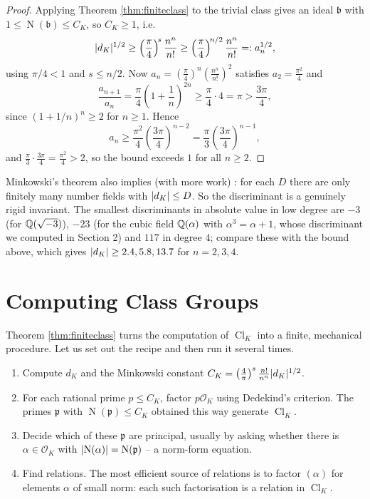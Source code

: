 \documentclass[a4paper]{scrartcl}
\renewcommand{\OO}{\mathcal{O}}
\newcommand{\Nm}{\operatorname{N}}
\newcommand{\Cl}{\operatorname{Cl}}
\newcommand{\fb}{\mathfrak{b}}
\newcommand{\fp}{\mathfrak{p}}
\begin{document}
\begin{proof}
	Applying Theorem \ref{thm:finiteclass} to the trivial class gives an ideal $\fb$ with $1 \le \Nm(\fb)\le C_K$, so $C_K \ge 1$, i.e.
	$$\lvert d_K\rvert^{1/2} \ge \left(\frac\pi4\right)^{\!s}\frac{n^n}{n!} \ge \left(\frac\pi4\right)^{\!n/2}\frac{n^n}{n!} =: a_n^{1/2},$$
	using $\pi/4 < 1$ and $s \le n/2$. Now $a_n = \left(\frac\pi4\right)^{n}\left(\frac{n^n}{n!}\right)^2$ satisfies $a_2 = \frac{\pi^2}{4}$ and
	$$\frac{a_{n+1}}{a_n} = \frac\pi4\left(1+\frac1n\right)^{2n} \ge \frac{\pi}{4}\cdot 4 = \pi > \frac{3\pi}{4},$$
	since $(1+1/n)^n \ge 2$ for $n \ge 1$. Hence
	$$a_n \ge \frac{\pi^2}{4}\left(\frac{3\pi}{4}\right)^{n-2} = \frac\pi3\left(\frac{3\pi}{4}\right)^{n-1},$$
	and $\frac\pi3\cdot\frac{3\pi}{4} = \frac{\pi^2}{4} > 2$, so the bound exceeds $1$ for all $n \ge 2$.
\end{proof}

\begin{remark}
	Minkowski's theorem also implies (with more work) : for each $D$ there are only finitely many number fields with $\lvert d_K\rvert\le D$. So the discriminant is a genuinely rigid invariant. The smallest discriminants in absolute value in low degree are $-3$ (for $\mathbb{Q}(\sqrt{-3})$), $-23$ (for the cubic field $\mathbb{Q}(\alpha)$ with $\alpha^3=\alpha+1$, whose discriminant we computed in Section 2) and $117$ in degree $4$; compare these with the bound above, which gives $\lvert d_K\rvert \geq 2.4, 5.8, 13.7$ for $n = 2,3,4$.
\end{remark}

\section{Computing Class Groups}\label{sec:computing}

Theorem \ref{thm:finiteclass} turns the computation of $\Cl_K$ into a finite, mechanical procedure. Let us set out the recipe and then run it several times.

\begin{enumerate}[label=(\arabic*)]
	\item Compute $d_K$ and the Minkowski constant $C_K = \left(\tfrac4\pi\right)^s\tfrac{n!}{n^n}\lvert d_K\rvert^{1/2}$.
	\item For each rational prime $p \le C_K$, factor $p\OO_K$ using Dedekind's criterion. The primes $\fp$ with $\Nm(\fp) \le C_K$ obtained this way generate $\Cl_K$.
	\item Decide which of these $\fp$ are principal, usually by asking whether there is $\alpha \in \OO_K$ with $\abs{\Nm(\alpha)} = \Nm(\fp)$ -- a norm-form equation.
	\item Find relations. The most efficient source of relations is to factor $(\alpha)$ for elements $\alpha$ of small norm: each such factorisation is a relation in $\Cl_K$.
\end{enumerate}
\end{document}
